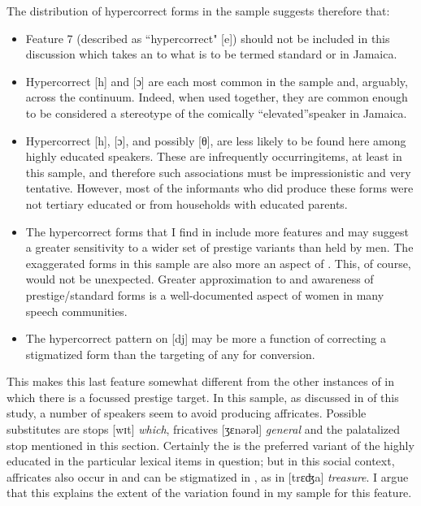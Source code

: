The distribution of hypercorrect forms in the sample suggests therefore that: 

\begin{itemize}
\item 
Feature 7 (described as ``hypercorrect" [e]) should not be included in this discussion which
 takes an  to what is to be termed standard or  in Jamaica.   

\item 
Hypercorrect [h] and [ɔ] are each most common in the sample and, arguably, across the  
continuum.  Indeed, when used together, they are common enough to be considered a stereotype of the comically ``elevated''\linebreak speaker in Jamaica. 
 
\item 
Hypercorrect [h], [ɔ], and possibly [θ], are less likely to be found here among highly 
educated  speakers.  These are infrequently occurring\linebreak items, at least in this sample, and therefore such associations must be impressionistic and very tentative.  However, most of the informants who did produce these forms were not tertiary educated or from households with educated parents.
 
\item 
The hypercorrect forms that I find in  include more features and may suggest a greater sensitivity to a wider set of prestige variants than held by men.  The exaggerated forms in this sample are also more an aspect of .  This, of course, would not be unexpected.  Greater approximation to and awareness of prestige\slash standard forms is a well-doc\-u\-ment\-ed aspect of women in many speech communities.                  
\item 
The hypercorrect pattern on [dj] may be more a function of correcting a stigmatized form than the targeting of any  for conversion.
\end{itemize}

  This makes this last feature somewhat different from the other instances of  in which there is a focussed prestige target.  In this sample, as discussed in  of this study, a number of speakers seem to avoid producing affricates.  Possible substitutes are stops [wɪt] \textit{which}, fricatives [ʒɛnǝrǝl] \textit{general} and the palatalized stop mentioned in this section.  Certainly the  is the preferred variant of the highly educated in the particular lexical items in question; but in this social context, affricates also occur in  and can be stigmatized in , as in [trɛʤa] \textit{treasure}.  I argue that this explains the extent of the variation found in my sample for this feature.

